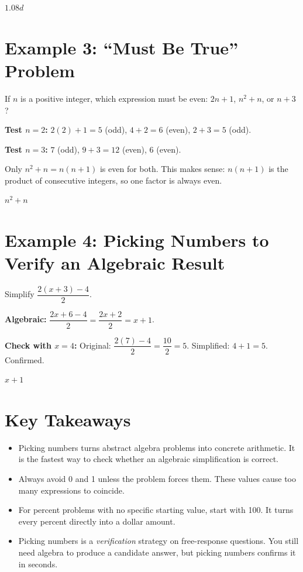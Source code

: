 \documentclass[14pt]{extarticle}
\begin{document}
\(\boxed{1.08d}\)

\section*{Example 3: ``Must Be True'' Problem}

If \(n\) is a positive integer, which expression must be even: \(2n + 1\), \(n^2 + n\), or \(n + 3\)?

\textbf{Test \(n = 2\):} \(2(2) + 1 = 5\) (odd), \(4 + 2 = 6\) (even), \(2 + 3 = 5\) (odd).

\textbf{Test \(n = 3\):} \(7\) (odd), \(9 + 3 = 12\) (even), \(6\) (even).

Only \(n^2 + n = n(n+1)\) is even for both. This makes sense: \(n(n+1)\) is the product of consecutive integers, so one factor is always even.

\(\boxed{n^2 + n}\)

\section*{Example 4: Picking Numbers to Verify an Algebraic Result}

Simplify \(\dfrac{2(x + 3) - 4}{2}\).

\textbf{Algebraic:} \(\dfrac{2x + 6 - 4}{2} = \dfrac{2x + 2}{2} = x + 1\).

\textbf{Check with \(x = 4\):} Original: \(\dfrac{2(7) - 4}{2} = \dfrac{10}{2} = 5\). Simplified: \(4 + 1 = 5\). Confirmed.

\(\boxed{x + 1}\)

\section*{Key Takeaways}
\begin{itemize}
  \item Picking numbers turns abstract algebra problems into concrete arithmetic. It is the fastest way to check whether an algebraic simplification is correct.
  \item Always avoid 0 and 1 unless the problem forces them. These values cause too many expressions to coincide.
  \item For percent problems with no specific starting value, start with 100. It turns every percent directly into a dollar amount.
  \item Picking numbers is a \textit{verification} strategy on free-response questions. You still need algebra to produce a candidate answer, but picking numbers confirms it in seconds.
\end{itemize}
\end{document}
